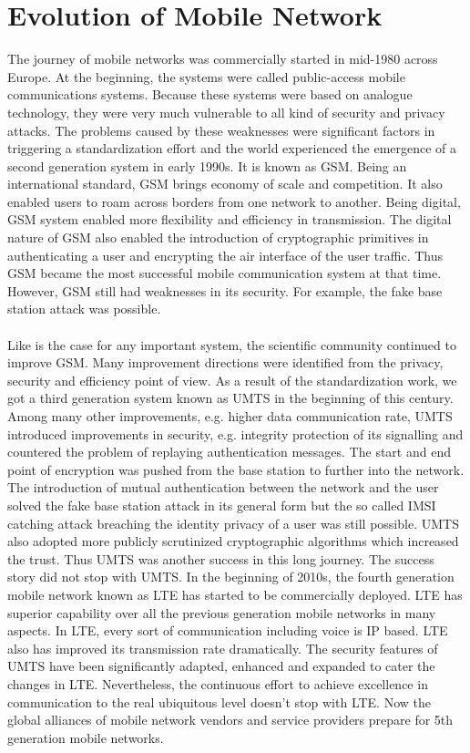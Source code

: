 \documentclass[14pt]{article}
\begin{document}
\section*{Evolution of Mobile Network}  The journey of mobile networks was commercially started in mid-1980 across Europe. At the beginning, the systems were called public-access mobile communications systems. Because these systems were based on analogue technology, they were very much vulnerable to all kind of security and privacy attacks. The problems caused by these weaknesses were significant factors in triggering a standardization effort and the world experienced the emergence of a second generation system in early 1990s. It is known as GSM. Being an international standard, GSM brings economy of scale and competition. It also enabled users to roam across borders from one network to another. Being digital, GSM system enabled more flexibility and efficiency in transmission. The digital nature of GSM also enabled the introduction of cryptographic primitives in authenticating a user and encrypting the air interface of the user traffic. Thus GSM became the most successful mobile communication system at that time. However, GSM still had weaknesses in its security. For example, the fake base station attack was possible. \paragraph{} Like is the case for any important system, the scientific community continued to improve GSM. Many improvement directions were identified from the privacy, security and efficiency point of view. As a result of the standardization work, we got a third generation system known as UMTS in the beginning of this century. Among many other improvements, e.g. higher data communication rate, UMTS introduced improvements in security, e.g. integrity protection of its signalling and countered the problem of replaying authentication messages. The start and end point of encryption was pushed from the base station to further into the network. The introduction of mutual authentication between the network and the user solved the fake base station attack in its general form but the so called IMSI catching attack breaching the identity privacy of a user was still possible. UMTS also adopted more publicly scrutinized cryptographic algorithms which increased the trust. Thus UMTS was another success in this long journey. The success story did not stop with UMTS. In the beginning of 2010s, the fourth generation mobile network known as LTE has started to be commercially deployed. LTE has superior capability over all the previous generation mobile networks in many aspects. In LTE, every sort of communication including voice is IP based. LTE also has improved its transmission rate dramatically. The security features of UMTS have been significantly adapted, enhanced and expanded to cater the changes in LTE. Nevertheless, the continuous effort to achieve excellence in communication to the real ubiquitous level doesn't stop with LTE. Now the global alliances of mobile network vendors and service providers prepare for 5th generation mobile networks.                           
\end{document}
